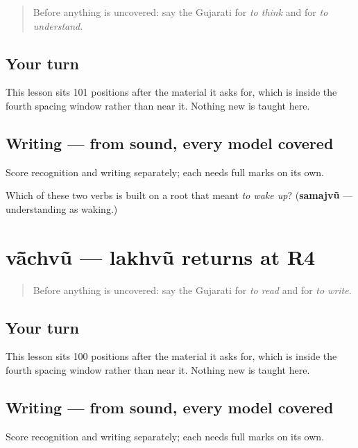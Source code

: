 \label{lesson:GU-R26-vicharvun-samajvun-r4}



\begin{quote}
Before anything is uncovered: say the Gujarati for \emph{to think} and for \emph{to understand}.
\end{quote}

\subsection*{Your turn}
This lesson sits 101 positions after the material it asks for, which is inside the fourth spacing window rather than near it. Nothing new is taught here.

\subsection*{Writing — from sound, every model covered}
Score recognition and writing separately; each needs full marks on its own.

\begin{tcolorbox}[breakable,colback=teal!4,colframe=teal!35!black,title={Before you move on}]
Which of these two verbs is built on a root that meant \emph{to wake up}? (\textbf{samajvũ} — understanding as waking.)
\end{tcolorbox}
\section[Practice]{vā̃chvũ — lakhvũ returns at R4}

\label{lesson:GU-R26-vanchvun-lakhvun-r4}



\begin{quote}
Before anything is uncovered: say the Gujarati for \emph{to read} and for \emph{to write}.
\end{quote}

\subsection*{Your turn}
This lesson sits 100 positions after the material it asks for, which is inside the fourth spacing window rather than near it. Nothing new is taught here.

\subsection*{Writing — from sound, every model covered}
Score recognition and writing separately; each needs full marks on its own.

